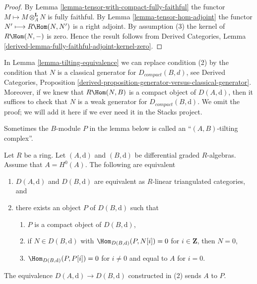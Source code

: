 \begin{proof}
By Lemma \ref{lemma-tensor-with-compact-fully-faithful}
the functor $M \longmapsto M \otimes_A^\mathbf{L} N$ is
fully faithful. By Lemma \ref{lemma-tensor-hom-adjoint}
the functor $N' \longmapsto R\Hom(N, N')$ is a right adjoint.
By assumption (3) the kernel of $R\Hom(N, -)$ is zero.
Hence the result follows from
Derived Categories, Lemma
\ref{derived-lemma-fully-faithful-adjoint-kernel-zero}.
\end{proof}

\begin{remark}
\label{remark-tilting-equivalence}
In Lemma \ref{lemma-tilting-equivalence} we can replace
condition (2) by the condition that $N$ is a classical
generator for $D_{compact}(B, d)$, see
Derived Categories, Proposition
\ref{derived-proposition-generator-versus-classical-generator}.
Moreover, if we knew that $R\Hom(N, B)$ is a compact object
of $D(A, \text{d})$, then it suffices to check that $N$
is a weak generator for $D_{compact}(B, \text{d})$.
We omit the proof; we will add it here if we ever
need it in the Stacks project.
\end{remark}

\noindent
Sometimes the $B$-module $P$ in the lemma below is called an
``$(A, B)$-tilting complex''.

\begin{lemma}
\label{lemma-rickard}
Let $R$ be a ring. Let $(A, \text{d})$ and $(B, \text{d})$ be
differential graded $R$-algebras. Assume that $A = H^0(A)$.
The following are equivalent
\begin{enumerate}
\item $D(A, \text{d})$ and $D(B, \text{d})$ are equivalent as $R$-linear
triangulated categories, and
\item there exists an object $P$ of $D(B, \text{d})$ such that
\begin{enumerate}
\item $P$ is a compact object of $D(B, \text{d})$,
\item if $N \in D(B, \text{d})$ with $\Hom_{D(B, \text{d})}(P, N[i]) = 0$
for $i \in \mathbf{Z}$, then $N = 0$,
\item $\Hom_{D(B, \text{d})}(P, P[i]) = 0$ for $i \not = 0$ and
equal to $A$ for $i = 0$.
\end{enumerate}
\end{enumerate}
The equivalence $D(A, \text{d}) \to D(B, \text{d})$
constructed in (2) sends $A$ to $P$.
\end{lemma}

